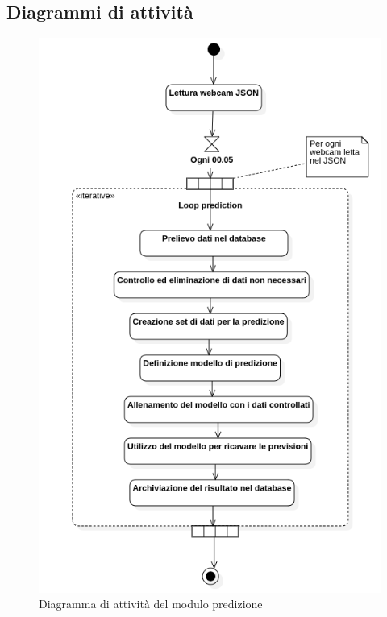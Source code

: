\subsection{Diagrammi di attività}\label{DiagrammaDiAttivitaPrediction}
\begin{center}
	\begin{figure}[H]
		\centering\includegraphics[scale=0.60]{../immagini/diag_PB/prediction_activity.png}
		\caption{Diagramma di attività del modulo predizione}
	\end{figure}
\end{center}


